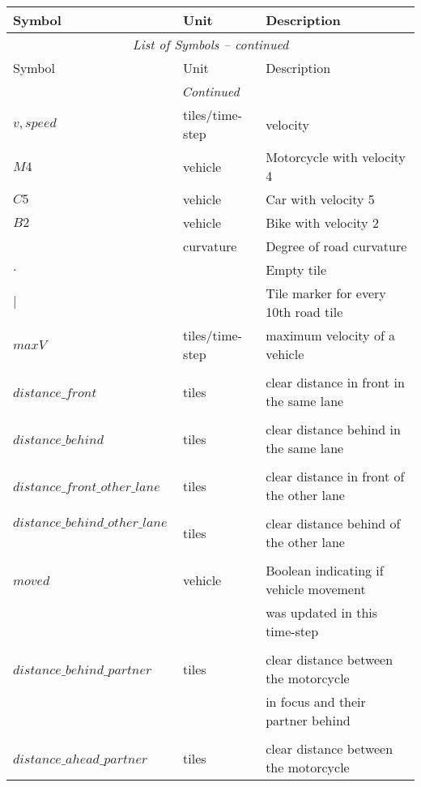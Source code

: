 \cleardoublepage
{}

\begin{center}
\begin{longtable}{@{}l l p{10cm}@{}}
\toprule
Symbol & Unit & Description \\
\midrule
\endfirsthead
\multicolumn{3}{c}{\textit{List of Symbols -- continued}}\\
\toprule
Symbol & Unit & Description \\
\midrule
\endhead
\bottomrule \multicolumn{3}{c}{\textit{Continued}} \\
\endfoot
\bottomrule
\endlastfoot

\(v, speed\) &tiles/time-step& velocity\\
\(M4\) & vehicle & Motorcycle with velocity 4\\
\(C5\) & vehicle & Car with velocity 5\\
\(B2\) & vehicle & Bike with velocity 2\\
\(~\) & curvature & Degree of road curvature\\
\(.\) & & Empty tile\\
\(|\) & & Tile marker for every 10th road tile\\
\(maxV\) & tiles/time-step & maximum velocity of a vehicle\\
\\$distance\_front$\ & tiles & clear distance in front in the same lane\\
\\$distance\_behind$\ & tiles & clear distance behind in the same lane\\
\\$distance\_front\_other\_lane$\ & tiles & clear distance in front of the other lane\\
\\$distance\_behind\_other\_lane$\ & tiles & clear distance behind of the other lane\\
\\$moved$\ & vehicle & Boolean indicating if vehicle movement\\
&&was updated in this time-step\\
\\$distance\_behind\_partner$\ & tiles & clear distance between the motorcycle\\
&&in focus and their partner behind\\
\\$distance\_ahead\_partner$\ & tiles & clear distance between the motorcycle\\

\end{longtable}
\end{center}
